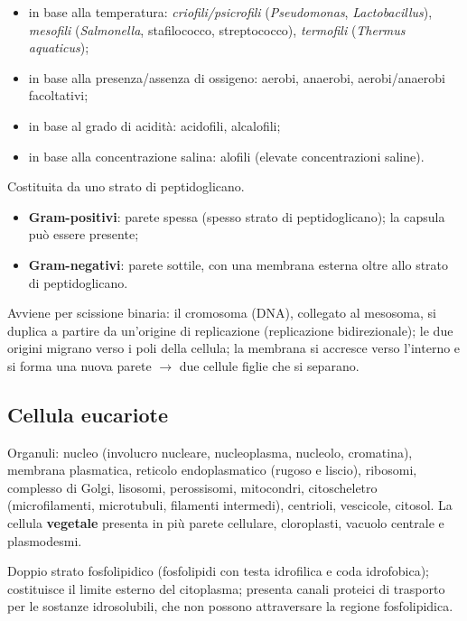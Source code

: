 \begin{itemize}
  \item in base alla temperatura: \textit{criofili/psicrofili} (\textit{Pseudomonas}, \textit{Lactobacillus}), \textit{mesofili} (\textit{Salmonella}, stafilococco, streptococco), \textit{termofili} (\textit{Thermus aquaticus});
  \item in base alla presenza/assenza di ossigeno: aerobi, anaerobi, aerobi/anaerobi facoltativi;
  \item in base al grado di acidità: acidofili, alcalofili;
  \item in base alla concentrazione salina: alofili (elevate concentrazioni saline).
\end{itemize}

Costituita da uno strato di peptidoglicano.
\begin{itemize}
  \item \textbf{Gram-positivi}: parete spessa (spesso strato di peptidoglicano); la capsula può essere presente;
  \item \textbf{Gram-negativi}: parete sottile, con una membrana esterna oltre allo strato di peptidoglicano.
\end{itemize}

Avviene per scissione binaria: il cromosoma (DNA), collegato al mesosoma, si duplica a partire da un'origine di replicazione (replicazione bidirezionale); le due origini migrano verso i poli della cellula; la membrana si accresce verso l'interno e si forma una nuova parete $\rightarrow$ due cellule figlie che si separano.

\subsection{Cellula eucariote}

Organuli: nucleo (involucro nucleare, nucleoplasma, nucleolo, cromatina), membrana plasmatica, reticolo endoplasmatico (rugoso e liscio), ribosomi, complesso di Golgi, lisosomi, perossisomi, mitocondri, citoscheletro (microfilamenti, microtubuli, filamenti intermedi), centrioli, vescicole, citosol. La cellula \textbf{vegetale} presenta in più parete cellulare, cloroplasti, vacuolo centrale e plasmodesmi.

Doppio strato fosfolipidico (fosfolipidi con testa idrofilica e coda idrofobica); costituisce il limite esterno del citoplasma; presenta canali proteici di trasporto per le sostanze idrosolubili, che non possono attraversare la regione fosfolipidica.

